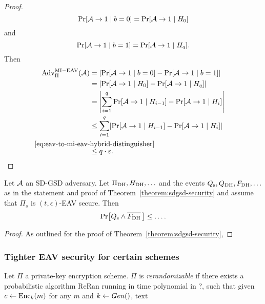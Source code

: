 \begin{proof}
	\[
		\pr{\adv \rightarrow 1 \mid b = 0} = \pr{\adv \rightarrow 1 \mid H_0}
	\]
	and
	\[
		\pr{\adv \rightarrow 1 \mid b = 1} = \pr{\adv \rightarrow 1 \mid H_q}.
	\]
	Then
	\begin{align*}
		\mathrm{Adv}_{\Pi}^{\mathrm{MI-EAV}}(\adv) & = \abs*{\pr{\adv \rightarrow 1 \mid b = 0} - \pr{\adv \rightarrow 1 \mid b = 1}}                      \\
		                                           & = \abs*{\pr{\adv \rightarrow 1 \mid H_0} - \pr{\adv \rightarrow 1 \mid H_q}}                          \\
		                                           & = \abs*{\sum_{i = 1}^{q} \pr{\adv \rightarrow 1 \mid H_{i - 1}} - \pr{\adv \rightarrow 1 \mid H_i}}   \\
		                                           & \le \sum_{i = 1}^{q} \abs*{\pr{\adv \rightarrow 1 \mid H_{i - 1}} - \pr{\adv \rightarrow 1 \mid H_i}} \\
		                                           & \stackrel{\mathclap{\eqref{eq:eav-to-mi-eav-hybrid-distinguisher}}}{\le} q \cdot \epsilon.
	\end{align*}
\end{proof}

\begin{lemma} \label{lemma:eav-reduction}
	Let $\mathcal{A}$ an SD-GSD adversary. Let $\Pi_{\mathrm{DH}}, H_\mathrm{DH}, \ldots$ and the events $Q_\mathrm{s}, Q_\mathrm{DH}, F_\mathrm{DH}, \ldots$ as in the statement and proof of Theorem~\vref{theorem:sdgsd-security} and assume that $\Pi_s$ is $(t, \epsilon)$-EAV secure. Then
	\[
		\pr{\qs \land \overline{\fdh}\,} \le \ldots.
	\]
\end{lemma}
\begin{proof}
	As outlined for the proof of Theorem~\vref{theorem:sdgsd-security},

\end{proof}

\subsubsection{Tighter EAV security for certain schemes}

\begin{definition}[Rerandomizability]
	Let $\Pi$ a private-key encryption scheme. $\Pi$ is \emph{rerandomizable} if there exists a probabilistic algorithm $\mathrm{ReRan}$ running in time polynomial in ?, such that given $c \leftarrow \mathrm{Enc}_k(m)$ for any $m$ and $k \leftarrow Gen()$, $\mathrm{text}$
\end{definition}

\begin{lemma}

\end{lemma}

